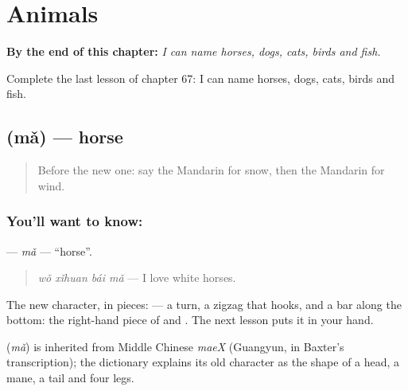 
\chapter{Animals}
\label{ch:zh-animals}

\begin{chapteropening}
\textbf{By the end of this chapter:} \emph{I can name horses, dogs, cats, birds and fish.}

Complete the last lesson of chapter 67: I can name horses, dogs, cats, birds and fish.
\end{chapteropening}

\section[\texorpdfstring{\zh{马} (mǎ)}{马 (mǎ)}]{ (mǎ) — horse}

\label{lesson:ZH-C67-ma}



\begin{quote}
Before the new one: say the Mandarin for snow, then the Mandarin for wind.
\end{quote}

\subsection*{You'll want to know: }
\textbf{} — \emph{mǎ} — \textquotedblleft{}horse\textquotedblright{}.

\begin{quote}
\textbf{} \emph{wǒ xǐhuan bái mǎ} — I love white horses.
\end{quote}

The new character, in pieces:  — a turn, a zigzag that hooks, and a bar along the bottom: the right-hand piece of  and . The next lesson puts it in your hand.

\begin{cousinweb}
\textbf{} (\emph{mǎ}) is inherited from Middle Chinese \emph{maeX} (Guangyun, in Baxter's transcription); the dictionary explains its old character as the shape of a head, a mane, a tail and four legs.
\end{cousinweb}


